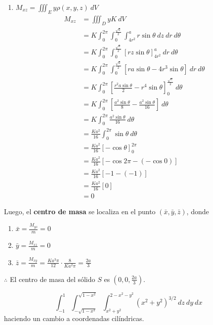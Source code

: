 \documentclass[12pt]{exam}
\begin{document}
\begin{questions}
\begin{enumerate}
  \item $M_{xz} = \iiint_E y \rho (x,y,z) ~ dV$
  \begin{align*}
    M_{xz}
    &= \iiint_D y K ~ dV \\
    &= K \int_0^{2\pi} \int_0^{\frac{\sqrt{a}}{2}} \int_{4r^2}^a r\sin{\theta} ~ dz ~ dr ~ d\theta \\
    &= K \int_0^{2\pi} \int_0^{\frac{\sqrt{a}}{2}} \left[ rz\sin{\theta} \right]_{4r^2}^a ~ dr ~ d\theta \\
    &= K \int_0^{2\pi} \int_0^{\frac{\sqrt{a}}{2}} \left[ ra\sin{\theta} - 4r^3\sin{\theta} \right] ~ dr ~ d\theta \\
    &= K \int_0^{2\pi} \left[ \frac{r^2a\sin{\theta}}{2} - r^4\sin{\theta} \right]_0^{\frac{\sqrt{a}}{2}} ~ d\theta \\
    &= K \int_0^{2\pi} \left[ \frac{a^2\sin{\theta}}{8} - \frac{a^2\sin{\theta}}{16} \right] ~ d\theta\\
    &= K \int_0^{2\pi} \frac{a^2\sin{\theta}}{16}  ~ d\theta \\
    &= \frac{K a^2}{16} \int_0^{2\pi} \sin{\theta}  ~ d\theta \\
    &= \frac{K a^2}{16} \left[ -\cos{\theta} \right]_0^{2\pi} \\
    &= \frac{K a^2}{16} \left[ -\cos{2\pi} - (-\cos{0}) \right] \\
    &= \frac{K a^2}{16} \left[ -1 - (-1) \right] \\
    &= \frac{K a^2}{16} \left[ 0 \right] \\
    &= 0
  \end{align*}
  \end{enumerate}

  Luego, el \textbf{centro de masa} se localiza en el punto $(\bar{x}, \bar{y}, \bar{z})$, donde

  \begin{enumerate}
  \item $\bar{x} = \frac{M_{yz}}{m} = 0$
  \item $\bar{y} = \frac{M_{xz}}{m} = 0$
  \item $\bar{z} = \frac{M_{xy}}{m} = \frac{K a^3 \pi}{12} \cdot \frac{8}{K a^2 \pi} = \frac{2a}{3}$
  \end{enumerate}
  
  $\therefore$ El centro de masa del sólido $S$ es $\left(0,0,\frac{2a}{3}\right)$.

  \[
  \int_{-1}^1 \int_{-\sqrt{1-x^2}}^{\sqrt{1-x^2}} \int_{x^2+y^2}^{2-x^2-y^2} (x^2+y^2)^{3/2} ~ dz ~ dy ~ dx
  \]
  haciendo un cambio a coordenadas cilíndricas.


\end{questions}
\end{document}
